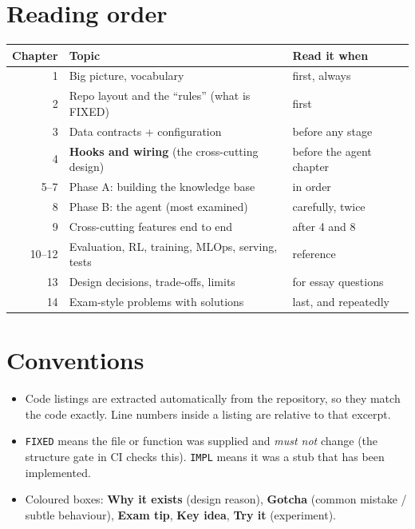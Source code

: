 \section*{Reading order}
\begin{center}
\begin{tabular}{@{}rll@{}}
\toprule
Chapter & Topic & Read it when \\
\midrule
1 & Big picture, vocabulary & first, always \\
2 & Repo layout and the ``rules'' (what is FIXED) & first \\
3 & Data contracts + configuration & before any stage \\
4 & \textbf{Hooks and wiring} (the cross-cutting design) & before the agent chapter \\
5--7 & Phase A: building the knowledge base & in order \\
8 & Phase B: the agent (most examined) & carefully, twice \\
9 & Cross-cutting features end to end & after 4 and 8 \\
10--12 & Evaluation, RL, training, MLOps, serving, tests & reference \\
13 & Design decisions, trade-offs, limits & for essay questions \\
14 & Exam-style problems with solutions & last, and repeatedly \\
\bottomrule
\end{tabular}
\end{center}

\section*{Conventions}
\begin{itemize}
 \item Code listings are extracted automatically from the repository, so they match the code exactly. Line numbers inside a listing are relative to that excerpt.
 \item \texttt{FIXED} means the file or function was supplied and \emph{must not} change (the structure gate in CI checks this). \texttt{IMPL} means it was a stub that has been implemented.
 \item Coloured boxes: \textbf{Why it exists} (design reason), \textbf{Gotcha} (common mistake / subtle behaviour), \textbf{Exam tip}, \textbf{Key idea}, \textbf{Try it} (experiment).
\end{itemize}

